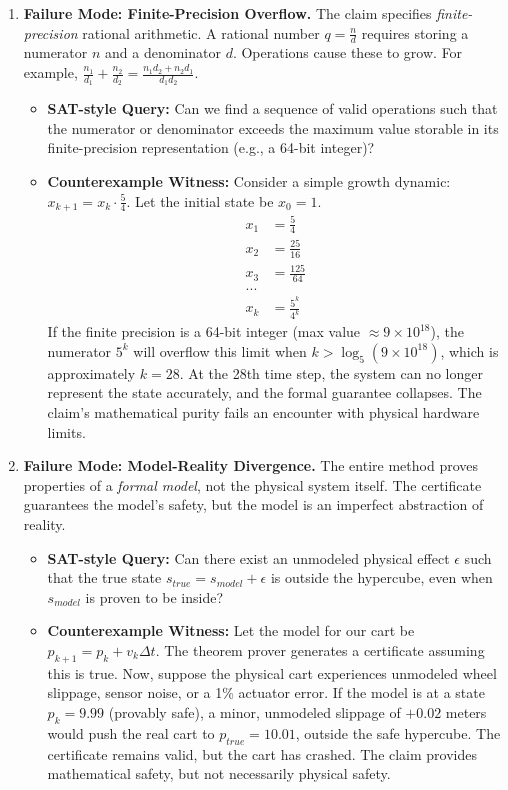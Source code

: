 \documentclass{article}
\begin{document}
\begin{enumerate}
    \item \textbf{Failure Mode: Finite-Precision Overflow.}
    The claim specifies \textit{finite-precision} rational arithmetic. A rational number $q = \frac{n}{d}$ requires storing a numerator $n$ and a denominator $d$. Operations cause these to grow. For example, $\frac{n_1}{d_1} + \frac{n_2}{d_2} = \frac{n_1 d_2 + n_2 d_1}{d_1 d_2}$.
    \begin{itemize}
        \item \textbf{SAT-style Query:} Can we find a sequence of valid operations such that the numerator or denominator exceeds the maximum value storable in its finite-precision representation (e.g., a 64-bit integer)?
        \item \textbf{Counterexample Witness:} Consider a simple growth dynamic: $x_{k+1} = x_k \cdot \frac{5}{4}$. Let the initial state be $x_0 = 1$.
        \begin{align*}
        x_1 &= \frac{5}{4} \\
        x_2 &= \frac{25}{16} \\
        x_3 &= \frac{125}{64} \\
        ... \\
        x_k &= \frac{5^k}{4^k}
        \end{align*}
        If the finite precision is a 64-bit integer (max value $\approx 9 \times 10^{18}$), the numerator $5^k$ will overflow this limit when $k > \log_5(9 \times 10^{18})$, which is approximately $k=28$. At the 28th time step, the system can no longer represent the state accurately, and the formal guarantee collapses. The claim's mathematical purity fails an encounter with physical hardware limits.
    \end{itemize}

    \item \textbf{Failure Mode: Model-Reality Divergence.}
    The entire method proves properties of a \textit{formal model}, not the physical system itself. The certificate guarantees the model's safety, but the model is an imperfect abstraction of reality.
    \begin{itemize}
        \item \textbf{SAT-style Query:} Can there exist an unmodeled physical effect $\epsilon$ such that the true state $s_{true} = s_{model} + \epsilon$ is outside the hypercube, even when $s_{model}$ is proven to be inside?
        \item \textbf{Counterexample Witness:} Let the model for our cart be $p_{k+1} = p_k + v_k \Delta t$. The theorem prover generates a certificate assuming this is true. Now, suppose the physical cart experiences unmodeled wheel slippage, sensor noise, or a 1\% actuator error. If the model is at a state $p_k = 9.99$ (provably safe), a minor, unmodeled slippage of $+0.02$ meters would push the real cart to $p_{true} = 10.01$, outside the safe hypercube. The certificate remains valid, but the cart has crashed. The claim provides mathematical safety, but not necessarily physical safety.
    \end{itemize}


\end{enumerate}
\end{document}
